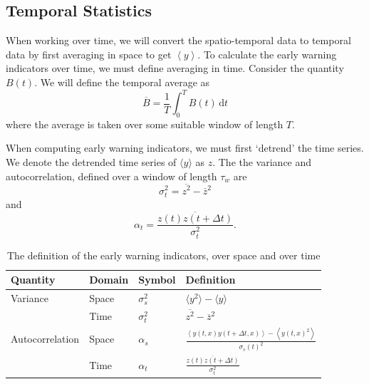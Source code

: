 \subsection{Temporal Statistics}
When working over time, we will convert the spatio-temporal data to temporal data by first averaging in space to get $\left\langle y \right\rangle$.
To calculate the early warning indicators over time, we must define averaging in time. Consider the quantity $B(t)$. We will
define the temporal average as
\begin{equation}
  \label{eq:definition_of_temporal_average}
  \overline{B} = \frac{1}{T}\int_0^TB(t)\,\mathrm{d}t
\end{equation}
where the average is taken over some suitable window of length $T$.

When computing early warning indicators, we must first `detrend' the time series. We denote the detrended time series of $\langle y \rangle$ as $z$.
The the variance and autocorrelation, defined over a window of length $\tau_w$ are
\begin{equation}
  \label{eq:temporal_variance}
  \sigma_t^2 = \overline{z^2} - \overline{z}^2 
\end{equation}
and
\begin{equation}
  \label{eq:temporal_autocorrelation}
  \alpha_t = \frac{\overline{z(t)z(t+\Delta t)}}{\sigma_t^2}.
\end{equation}
\begin{table}
  \centering
  \begin{tabular}{llll}
    \toprule
    Quantity        & Domain & Symbol        & Definition \\
    \midrule
    Variance        & Space  & $\sigma_s^2$  & $\langle y^2 \rangle - \langle y \rangle$ \\
    \rule{0pt}{4ex}    
                    & Time   & $\sigma_t^2$  & $\overline{z^2} - \overline{z}^2$ \\
    \rule{0pt}{4ex}    
    Autocorrelation & Space  & $\alpha_s$    & $\frac{\left\langle y\left(t,x\right)y\left(t+\Delta t,x\right)\right\rangle - \left\langle y\left(t,x\right)^2 \right\rangle}{\sigma_s(t)^2}$ \\
    \rule{0pt}{4ex}    
                    & Time   & $\alpha_t$    &  $\frac{\overline{z(t)z(t+\Delta t)}}{\sigma_t^2}$ \\
    \bottomrule
  \end{tabular}
  \caption[Definition of spatial and temporal early warning signals]{The definition of the early warning indicators, over space and over time}
  \label{tab:ews_space_time_definition}
\end{table}


